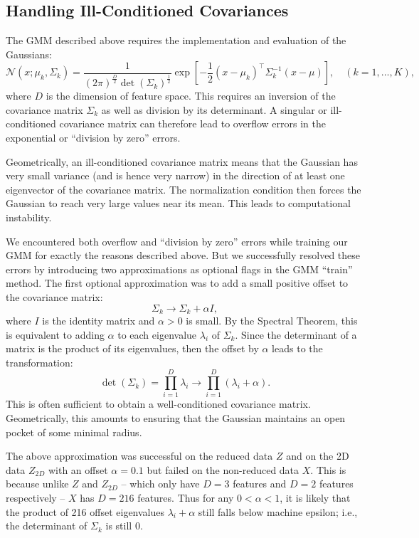 \documentclass[12pt]{article}
\begin{document}
\subsection{Handling Ill-Conditioned Covariances}
\label{section-errors}

The GMM described above requires the implementation and evaluation of the Gaussians:
\[ \mathcal{N}(x; \mu_k, \Sigma_k) = \frac{1}{(2\pi)^{\frac{D}{2}}\operatorname{det}(\Sigma_k)^{\frac{1}{2}}}\exp\left[-\frac{1}{2}(x-\mu_k)^\top\Sigma_k^{-1}(x-\mu)\right],
\quad (k=1,\ldots,K), \]
where $D$ is the dimension of feature space. This requires an inversion of the covariance matrix $\Sigma_k$ as well as division by its determinant. A singular or ill-conditioned covariance matrix can therefore lead to overflow errors in the exponential or ``division by zero'' errors.

Geometrically, an ill-conditioned covariance matrix means that the Gaussian has very small variance (and is hence very narrow) in the direction of at least one eigenvector of the covariance matrix. The normalization condition then forces the Gaussian to reach very large values near its mean. This leads to computational instability.

We encountered both overflow and ``division by zero'' errors while training our GMM for exactly the reasons described above. But we successfully resolved these errors by introducing two approximations as optional flags in the GMM ``train'' method. The first optional approximation was to add a small positive offset to the covariance matrix:
\[ \Sigma_k \rightarrow \Sigma_k+\alpha I, \]
where $I$ is the identity matrix and $\alpha > 0$ is small. By the Spectral Theorem, this is equivalent to adding $\alpha$ to each eigenvalue $\lambda_i$ of $\Sigma_k$. Since the determinant of a matrix is the product of its eigenvalues, then the offset by $\alpha$ leads to the transformation:
\[ \operatorname{det}(\Sigma_k) = \prod_{i=1}^D \lambda_i
\rightarrow \prod_{i=1}^D (\lambda_i+\alpha). \]
This is often sufficient to obtain a well-conditioned covariance matrix. Geometrically, this amounts to ensuring that the Gaussian maintains an open pocket of some minimal radius.

The above approximation was successful on the reduced data $Z$ and on the 2D data $Z_{2D}$ with an offset $\alpha=0.1$ but failed on the non-reduced data $X$. This is because unlike $Z$ and $Z_{2D}$ -- which only have $D=3$ features and $D=2$ features respectively -- $X$ has $D=216$ features. Thus for any $0 <\alpha < 1$, it is likely that the product of 216 offset eigenvalues $\lambda_i+\alpha$ still falls below machine epsilon; i.e., the determinant of $\Sigma_k$ is still $0$.
\end{document}
